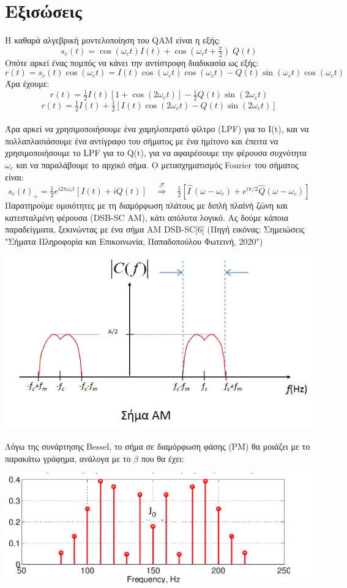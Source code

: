 \documentclass{article}
\begin{document}
\section{Εξισώσεις}
Η καθαρά αλγεβρική μοντελοποίηση του QAM είναι η εξής:
$${\displaystyle s_{c}(t) = \cos(ω_{c}t)I(t)+{\cos \left(ω_{c}t+{\tfrac {\pi }{2}}\right)}\;Q(t)}$$
Οπότε αρκεί ένας πομπός να κάνει την αντίστροφη διαδικασία ως εξής:
$${\displaystyle r(t)=s_{c}(t)\cos(ω_{c}t)=I(t)\cos(ω_{c}t)\cos(ω_{c}t)-Q(t)\sin(ω_{c}t)\cos(ω_{c}t)}$$
Άρα έχουμε:
$${\displaystyle r(t)={\tfrac {1}{2}}I(t)\left[1+\cos(2ω_{c}t)\right]-{\tfrac {1}{2}}Q(t)\sin(2ω_{c}t)}$$
$$r(t)={\tfrac {1}{2}}I(t)+{\tfrac {1}{2}}\left[I(t)\cos(2ω_{c}t)-Q(t)\sin(2ω_{c}t)\right]$$\\[8pt]
Άρα αρκεί να χρησιμοποιήσουμε ένα χαμηλοπερατό φίλτρο (LPF) για το I(t), και να πολλαπλασιάσουμε ένα αντίγραφο του σήματος με ένα ημίτονο και έπειτα να χρησιμοποιήσουμε το LPF για το Q(t), για να αφαιρέσουμε την φέρουσα συχνότητα $ω_{c}$ και να παραλάβουμε το αρχικό σήμα. Ο μετασχηματισμός Fourier του σήματος είναι:
$${\displaystyle s_{c}(t)_{+}={\tfrac {1}{2}}e^{i2\pi ω_{c}t}[I(t)+iQ(t)]\quad {\stackrel {\mathcal {F}}{\Longrightarrow }}\quad {\tfrac {1}{2}}\left[{\widehat {I\ }}(ω-ω_{c})+e^{i\pi /2}{\widehat {Q}}(ω-ω_{c})\right]}$$
Παρατηρούμε ομοιότητες με τη διαμόρφωση πλάτους με διπλή πλαϊνή ζώνη και κατεσταλμένη φέρουσα (DSB-SC AM), κάτι απόλυτα λογικό. Ας δούμε κάποια παραδείγματα, ξεκινώντας με ένα σήμα AM DSB-SC[6] (Πηγή εικόνας: Σημειώσεις "Σήματα Πληροφορία και Επικοινωνία, Παπαδοπούλου Φωτεινή, 2020")
\begin{center}
    \includegraphics[scale=0.8]{papadop_1.png}
\end{center}
Λόγω της συνάρτησης Bessel, το σήμα σε διαμόρφωση φάσης (PM) θα μοιάζει με το παρακάτω γράφημα, ανάλογα με το $β$ που θα έχει:
\begin{center}
    \includegraphics[scale=0.6]{papado3.png}
\end{center}
\end{document}
